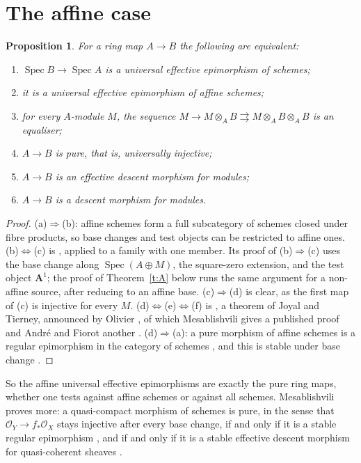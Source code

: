 \documentclass[11pt,a4paper]{amsart}
\newtheorem{proposition}[theorem]{Proposition}
\theoremstyle{definition}
\theoremstyle{remark}
\newcommand{\Spec}{\operatorname{Spec}}
\begin{document}
\section{The affine case}\label{sec:affine}

\begin{proposition}\label{p:affine}
For a ring map $A\to B$ the following are equivalent:
\begin{enumerate}
\item[(a)] $\Spec B\to\Spec A$ is a universal effective epimorphism of schemes;
\item[(b)] it is a universal effective epimorphism of affine schemes;
\item[(c)] for every $A$-module $M$, the sequence $M\to M\otimes_AB\rightrightarrows M\otimes_AB\otimes_AB$ is an equaliser;
\item[(d)] $A\to B$ is pure, that is, universally injective;
\item[(e)] $A\to B$ is an effective descent morphism for modules;
\item[(f)] $A\to B$ is a descent morphism for modules.
\end{enumerate}
\end{proposition}

\begin{proof}
(a)$\Rightarrow$(b): affine schemes form a full subcategory of schemes closed under fibre products, so base changes and test objects can be restricted to affine ones. (b)$\Leftrightarrow$(c) is \cite[0EUA]{stacks}, applied to a family with one member. Its proof of (b)$\Rightarrow$(c) uses the base change along $\Spec(A\oplus M)$, the square-zero extension, and the test object $\mathbf A^1$; the proof of Theorem~\ref{t:A} below runs the same argument for a non-affine source, after reducing to an affine base. (c)$\Rightarrow$(d) is clear, as the first map of (c) is injective for every $M$. (d)$\Leftrightarrow$(e)$\Leftrightarrow$(f) is \cite[08XA]{stacks}, a theorem of Joyal and Tierney, announced by Olivier \cite{olivier}, of which Mesablishvili gives a published proof \cite{mesablishvili} and André and Fiorot another \cite[Prop.~3.3]{af}. (d)$\Rightarrow$(a): a pure morphism of affine schemes is a regular epimorphism in the category of schemes \cite[Thm.~5.7, Cor.~5.8]{mesablishvili2004}, and this is stable under base change \cite[Cor.~5.10]{mesablishvili2004}.
\end{proof}

So the affine universal effective epimorphisms are exactly the pure ring maps, whether one tests against affine schemes or against all schemes. Mesablishvili proves more: a quasi-compact morphism of schemes is pure, in the sense that $\mathcal O_Y\to f_*\mathcal O_X$ stays injective after every base change, if and only if it is a stable regular epimorphism \cite[Thm.~5.11]{mesablishvili2004}, and if and only if it is a stable effective descent morphism for quasi-coherent sheaves \cite{mesablishvili-acs}.
\end{document}
